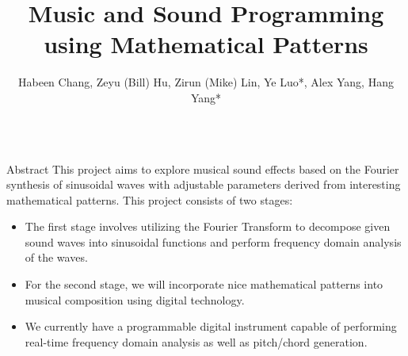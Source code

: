 \documentclass[leqno,presentation]{beamer}
\title{
\veryHuge
Music and Sound Programming using Mathematical Patterns}
\author{
  \LARGE
  Habeen Chang, Zeyu (Bill) Hu, Zirun (Mike) Lin, Ye Luo*, Alex Yang, Hang Yang*}
\institute{
\raisebox{-2ex}{\texttt{[image: rice.png]}}
{\Large\textcolor{blue!50!orange}{ \Huge{Rice Geometry Laboratory}}}
}
\date{\large \textbox{~\hfill}\textbox{\hfil RGL Open House, April 21,
2017\hfil}\textbox{\hfill (*mentors)} }
\theoremstyle{definition}
\begin{document}
\begin{frame}


\begin{block}{}
\titlepage
\end{block}


\begin{columns}[t]


\begin{column}{.25\linewidth}
\begin{block}{Abstract}
This project aims to explore musical sound effects based on the Fourier synthesis of sinusoidal waves with adjustable parameters derived from interesting mathematical patterns.
This project consists of two stages:
\begin{itemize}
\item The first stage involves utilizing the Fourier Transform to decompose given sound waves into sinusoidal functions and perform frequency domain analysis of the waves. 
\item For the second stage, we will incorporate nice mathematical patterns into musical composition using digital technology. 
\item We currently have a programmable digital instrument capable of performing real-time frequency domain analysis as well as pitch/chord generation.
\end{itemize}
\end{block}


\end{column}
\end{columns}
\end{frame}
\end{document}
